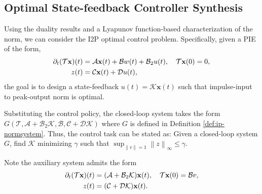 \documentclass[letterpaper, 10 pt, conference]{ieeeconf}
\newcommand{\mcl}[1]{\mathcal{#1}}
\newcommand{\mbf}[1]{\mathbf{#1}}
\newcommand{\norm}[1]{\left\lVert #1 \right\rVert}
\theoremstyle{definition}
\begin{document}

\subsection{Optimal State-feedback Controller Synthesis}
Using the duality results and a Lyapunov function-based characterization of the norm, we can consider the I2P optimal control problem. Specifically, given a PIE of the form,
\begin{align}
    \partial_t(\mcl T\mbf x)(t) &= \mcl A\mbf x(t) + \mcl B w(t) + \mcl B_2u(t), \quad \mcl T\mbf x(0) = 0,\notag\\
    z(t) &= \mcl C\mbf x(t) + \mcl D u(t), \label{eq:PIEcontrol}
\end{align}
the goal is to design a state-feedback $u(t) = \mcl K\mbf x(t)$ such that impulse-input to peak-output norm is optimal. %

Substituting the control policy, the closed-loop system takes the form $G(\mcl T, \mcl A+\mcl B_2\mcl K,\mcl B, \mcl C+\mcl D\mcl K)$ where $G$ is defined in Definition \ref{def:ip-normsystem}. Thus, the control task can be stated as: Given a closed-loop system $G$, find $\mcl K$ minimizing $\gamma$ such that $\sup_{\norm{v}=1} \norm{z}_\infty\le \gamma$.  

Note the auxiliary system admits the form
\begin{align}\label{eqn:PIEauxwinput}
\partial_t(\mcl T\mbf x)(t) &= (\mcl A+\mcl B_2\mcl K)\mbf x(t), \quad\mcl T\mbf x(0) = \mcl Bv, \notag\\
z(t) &= (\mcl C+\mcl D\mcl K)\mbf x(t).
\end{align}
\end{document}
